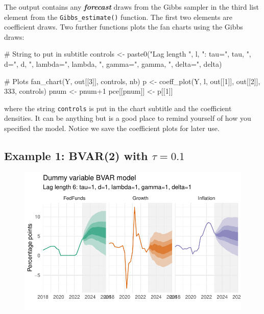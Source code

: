 \documentclass[
  letterpaper,
]{book}
\newenvironment{Shaded}{\begin{snugshade}}{\end{snugshade}}
\newcommand{\CommentTok}[1]{\textcolor[rgb]{0.37,0.37,0.37}{#1}}
\newcommand{\DecValTok}[1]{\textcolor[rgb]{0.68,0.00,0.00}{#1}}
\newcommand{\FunctionTok}[1]{\textcolor[rgb]{0.28,0.35,0.67}{#1}}
\newcommand{\NormalTok}[1]{\textcolor[rgb]{0.00,0.23,0.31}{#1}}
\newcommand{\OtherTok}[1]{\textcolor[rgb]{0.00,0.23,0.31}{#1}}
\newcommand{\SpecialCharTok}[1]{\textcolor[rgb]{0.37,0.37,0.37}{#1}}
\newcommand{\StringTok}[1]{\textcolor[rgb]{0.13,0.47,0.30}{#1}}
\begin{document}
The output contains any \textbf{\emph{forecast}} draws from the Gibbs
sampler in the third list element from the \texttt{Gibbs\_estimate()}
function. The first two elements are coefficient draws. Two further
functions plots the fan charts using the Gibbs draws:

\begin{Shaded}
\begin{Highlighting}[]
\CommentTok{\# String to put in subtitle}
\NormalTok{controls }\OtherTok{\textless{}{-}} \FunctionTok{paste0}\NormalTok{(}\StringTok{"Lag length "}\NormalTok{, l, }\StringTok{": tau="}\NormalTok{, tau, }\StringTok{", d="}\NormalTok{, d,}
                   \StringTok{", lambda="}\NormalTok{, lambda, }\StringTok{", gamma="}\NormalTok{, gamma, }\StringTok{", delta="}\NormalTok{, delta)}

\CommentTok{\# Plots}
\FunctionTok{fan\_chart}\NormalTok{(Y, out[[}\DecValTok{3}\NormalTok{]], controls, nb)}
\NormalTok{p           }\OtherTok{\textless{}{-}} \FunctionTok{coeff\_plot}\NormalTok{(Y, l, out[[}\DecValTok{1}\NormalTok{]], out[[}\DecValTok{2}\NormalTok{]], }\DecValTok{333}\NormalTok{, controls)}
\NormalTok{pnum        }\OtherTok{\textless{}{-}}\NormalTok{ pnum}\SpecialCharTok{+}\DecValTok{1}
\NormalTok{pce[[pnum]] }\OtherTok{\textless{}{-}}\NormalTok{ p[[}\DecValTok{1}\NormalTok{]]}
\end{Highlighting}
\end{Shaded}

where the string \texttt{controls} is put in the chart subtitle and the
coefficient densities. It can be anything but is a good place to remind
yourself of how you specified the model. Notice we save the coefficient
plots for later use.

\hypertarget{example-1-bvar2-with-tau0.1}{%
\subsection{\texorpdfstring{Example 1: BVAR(2) with
\(\tau=0.1\)}{Example 1: BVAR(2) with \textbackslash tau=0.1}}\label{example-1-bvar2-with-tau0.1}}

\begin{figure}

{\centering \includegraphics{BVAR_files/figure-pdf/estim-1.pdf}

}

\end{figure}
\end{document}
